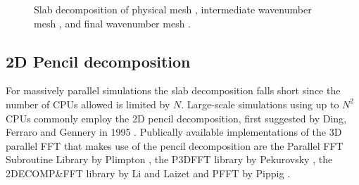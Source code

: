 \documentclass[11pt, oneside]{article}
\begin{document}
\begin{figure}[t!]
{  \label{slabsubfig1}
}
\caption{Slab decomposition of physical mesh , intermediate wavenumber mesh , and final wavenumber mesh .  }
\label{fig:Slabdecomp}
\end{figure}

\subsection{2D Pencil decomposition}
\label{pencil2D}

For massively parallel simulations the slab decomposition falls short since the number of CPUs allowed is limited by $N$. Large-scale simulations using up to $N^2$ CPUs commonly employ the 2D pencil decomposition, first suggested by Ding, Ferraro and Gennery in 1995 \cite{Ding95}. Publically available implementations of the 3D parallel FFT that makes use of the pencil decomposition are the Parallel FFT Subroutine Library by Plimpton \cite{PlimptonFFT}, the P3DFFT library by Pekurovsky \cite{p3dfft, pekurovsky2012}, the 2DECOMP\&FFT library by Li and Laizet \cite{Li2010} and PFFT by Pippig \cite{Pi13}.
\end{document}
